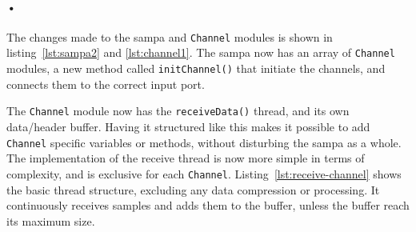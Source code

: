 \documentclass[a4paper, 12pt]{report}
\newcommand{\codeword}[1]{\texttt{#1}}
\begin{document}
\begin{minipage}{\linewidth}

\end{minipage}

\begin{minipage}{\linewidth}

\end{minipage}

\paragraph{•}
The changes made to the \gls{sampa} and \codeword{Channel} modules is shown in listing~\ref{lst:sampa2} and \ref{lst:channel1}.
The \gls{sampa} now has an array of \codeword{Channel} modules, a new method called \codeword{initChannel()} that initiate the channels, and connects them to the correct input port.

\begin{minipage}{\linewidth}

\end{minipage}

\begin{minipage}{\linewidth}

\end{minipage}

The \codeword{Channel} module now has the \codeword{receiveData()} thread, and its own data/header buffer.
Having it structured like this makes it possible to add \codeword{Channel} specific variables or methods, without disturbing the \gls{sampa} as a whole.
The implementation of the receive thread is now more simple in terms of complexity, and is exclusive for each \codeword{Channel}.
Listing~\ref{lst:receive-channel} shows the basic thread structure, excluding any data compression or processing.
It continuously receives samples and adds them to the buffer, unless the buffer reach its maximum size.

\begin{minipage}{\linewidth}

\end{minipage}
\end{document}
